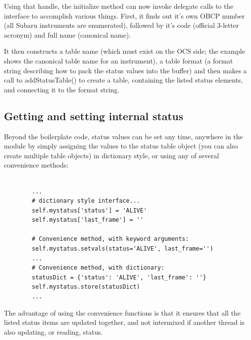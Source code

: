\documentclass[11pt]{report}
\begin{document}
Using that handle, the initialize method can now invoke delegate calls
to the interface to accomplish various things. First, it finds out it's
own OBCP number (all Subaru instruments are enumerated), followed by
it's code (official 3-letter acronym) and full name (canonical name). 

It then constructs a table name (which must exist on the OCS side; the
example shows the canonical table name for an instrument), a table
format (a format string describing how to pack the status values into
the buffer) and then makes a call to addStatusTable() to create a table,
containing the listed status elements, and connecting it to the format
string. 

\subsection{Getting and setting internal status}
Beyond the boilerplate code, status values can be set any time, anywhere
in the module by simply assigning the values to the status table object
(you can also create multiple table objects) in dictionary style, or
using any of several convenience methods: 
\begin{verbatim}

        ...
        # dictionary style interface...
        self.mystatus['status'] = 'ALIVE'
        self.mystatus['last_frame'] = ''

        # Convenience method, with keyword arguments:
        self.mystatus.setvals(status='ALIVE', last_frame='')
        ...
        # Convenience method, with dictionary:
        statusDict = {'status': 'ALIVE', 'last_frame': ''}
        self.mystatus.store(statusDict)
        ...

\end{verbatim}
The advantage of using the convenience functions is that it ensures that
all the listed status items are updated together, and not intermixed if
another thread is also updating, or reading, status. 
\end{document}

